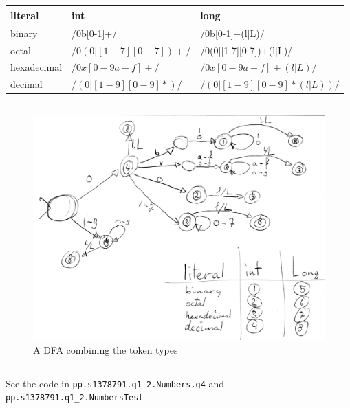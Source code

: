 \subsection{}
\begin{tabular}{lll}
literal & int & long \\
\hline
binary & /0b[0-1]+/ & /0b[0-1]+(l|L)/ \\
octal & $ /0(0|[1-7][0-7])+/ $ & /0(0|[1-7][0-7])+(l|L)/ \\
hexadecimal & $ /0x[0-9a-f]+/ $ & $ /0x[0-9a-f]+(l|L)/ $ \\
decimal & $ /(0|[1-9][0-9]*)/ $ & $ /(0|[1-9][0-9]*(l|L))/ $ \\
\end{tabular}
\subsection{}
\begin{figure}[H]
\centering
\includegraphics[width=\linewidth]{2_small.png}
\caption{A DFA combining the token types}
\end{figure}
\subsection{}
See the code in \texttt{pp.s1378791.q1\_2.Numbers.g4} and \texttt{pp.s1378791.q1\_2.NumbersTest}